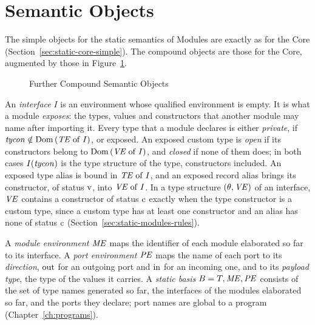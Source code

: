 \section{Semantic Objects}\label{sec:static-modules-objects}

The simple objects for the static semantics of Modules are exactly as for the
Core (Section~\ref{sec:static-core-simple}). The compound objects are those
for the Core, augmented by those in Figure~\ref{fig:static-modules-compound}.

\begin{figure}[ht]
\centering
\begin{objtable}
\end{objtable}
\caption{Further Compound Semantic Objects}\label{fig:static-modules-compound}
\end{figure}

An \emph{interface} $I$ is an environment whose qualified environment is empty.
It is what a module \emph{exposes}: the types, values and constructors that
another module may name after importing it. Every type that a module declares
is either \emph{private}, if $\mathit{tycon} \notin \mathrm{Dom}\,(\mathit{TE} \mathrel{\mathrm{of}} I)$, or exposed. An
exposed custom type is \emph{open} if its constructors belong to $\mathrm{Dom}\,(\mathit{VE} \mathrel{\mathrm{of}}
I)$, and \emph{closed} if none of them does; in both cases $I(\mathit{tycon})$ is the
type structure of the type, constructors included. An exposed type alias is
bound in $\mathit{TE} \mathrel{\mathrm{of}} I$, and an exposed record alias brings its constructor, of
status $\mathrm{v}$, into $\mathit{VE} \mathrel{\mathrm{of}} I$. In a type structure $(\theta, \mathit{VE})$ of an
interface, $\mathit{VE}$ contains a constructor of status $\mathrm{c}$ exactly when the type
constructor is a custom type, since a custom type has at least one constructor
and an alias has none of status $\mathrm{c}$
(Section~\ref{sec:static-modules-rules}).

A \emph{module environment} $\mathit{ME}$ maps the identifier of each module elaborated
so far to its interface. A \emph{port environment} $\mathit{PE}$ maps the name of each
port to its \emph{direction}, $\mathrm{out}$ for an outgoing port and $\mathrm{in}$
for an incoming one, and to its \emph{payload type}, the type of the values it
carries. A \emph{static basis} $B = T, \mathit{ME}, \mathit{PE}$ consists of the set of type
names generated so far, the interfaces of the modules elaborated so far, and
the ports they declare; port names are global to a program
(Chapter~\ref{ch:programs}). %


